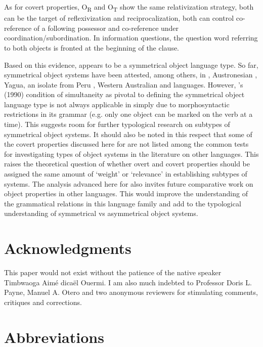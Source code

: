 \documentclass[output=paper]{langsci/langscibook}
\begin{document}
As for covert properties, O\textsubscript{R} and O\textsubscript{T} show the same relativization strategy, both can be the target of reflexivization and reciprocalization, both can control co-reference of a following possessor and co-reference under coordination/subordination. In information questions, the question word referring to both objects is fronted at the beginning of the clause. 

Based on this evidence,  appears to be a symmetrical object language type. So far, symmetrical object systems have been attested, among others, in  \citep{bresnanmoshi1990}, Austronesian \citep{donohue1996}, Yagua, an isolate from Peru \citep{paynepayne1989}, Western Australian \citep{dench1995} and  \citep{mckaytrechsel2008} languages. However, \citeauthor{bresnanmoshi1990}'s (1990)  condition of simultaneity as pivotal to defining the symmetrical object language type is not always applicable in  simply due to morphosyntactic restrictions in its grammar (e.g. only one object can be marked on the verb at a time). This suggests room for further typological research on subtypes of symmetrical object systems. It should also be noted in this respect that some of the covert properties discussed here for  are not listed among the common tests for investigating types of object systems in the literature on other languages. This raises the theoretical question of whether overt and covert properties should be assigned the same amount of `weight' or `relevance' in establishing subtypes of systems. The analysis advanced here for  also invites future comparative work on object properties in other  languages. This would improve the understanding of the grammatical relations in this language family and add to the typological understanding of symmetrical vs asymmetrical object systems.

\section*{Acknowledgments}

This paper would not exist without the patience of the  native speaker Timbwaoga Aimé dicaël Ouermi. I am also much indebted to Professor Doris L. Payne, Manuel A. Otero and two anonymous reviewers for stimulating comments, critiques and corrections. 

\section*{Abbreviations}
\end{document}

